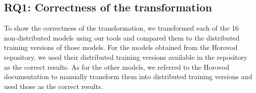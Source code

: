 

\subsection{RQ1: Correctness of the transformation}
To show the correctness of the transformation, we transformed each of the 16
non-distributed models using our tools and compared them to the distributed training
versions of those models.
For the models obtained from the Horovod repository, we used their distributed
training versions available in the repository as the correct results.
As for the other models, we referred to the Horovod documentation to manually
transform them into distributed training versions and used those as the correct
results.

